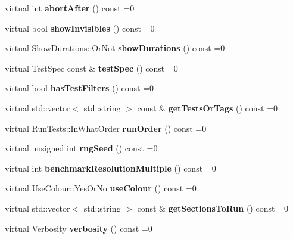 \begin{DoxyCompactItemize}
virtual int {\bfseries abort\+After} () const =0
\item 
\mbox{\label{structCatch_1_1IConfig_aa288bf92ccd0aafd85409d8aefdf738c}} 
virtual bool {\bfseries show\+Invisibles} () const =0
\item 
\mbox{\label{structCatch_1_1IConfig_abaa97d281484278291f0d3db6d404aeb}} 
virtual Show\+Durations\+::\+Or\+Not {\bfseries show\+Durations} () const =0
\item 
\mbox{\label{structCatch_1_1IConfig_a03a2fd8221d896d12bf3684ab2a03588}} 
virtual Test\+Spec const  \& {\bfseries test\+Spec} () const =0
\item 
\mbox{\label{structCatch_1_1IConfig_a49a475bbeb3180c06799d6d958914649}} 
virtual bool {\bfseries has\+Test\+Filters} () const =0
\item 
\mbox{\label{structCatch_1_1IConfig_a1b8a299344a493eb98c12faae48421d7}} 
virtual std\+::vector$<$ std\+::string $>$ const  \& {\bfseries get\+Tests\+Or\+Tags} () const =0
\item 
\mbox{\label{structCatch_1_1IConfig_a0fc59c9aba1d4018538d5526daa5eb78}} 
virtual Run\+Tests\+::\+In\+What\+Order {\bfseries run\+Order} () const =0
\item 
\mbox{\label{structCatch_1_1IConfig_ae049eb45979d841073fa65d1094c7f14}} 
virtual unsigned int {\bfseries rng\+Seed} () const =0
\item 
\mbox{\label{structCatch_1_1IConfig_a775f740b8af9df931e87db51dfdc6033}} 
virtual int {\bfseries benchmark\+Resolution\+Multiple} () const =0
\item 
\mbox{\label{structCatch_1_1IConfig_a87ec19a6b486eb5b5015cf7738fee026}} 
virtual Use\+Colour\+::\+Yes\+Or\+No {\bfseries use\+Colour} () const =0
\item 
\mbox{\label{structCatch_1_1IConfig_afc801995e115557f90e41f3d6e96908d}} 
virtual std\+::vector$<$ std\+::string $>$ const  \& {\bfseries get\+Sections\+To\+Run} () const =0
\item 
\mbox{\label{structCatch_1_1IConfig_a55aff5924bdbb3f558775821b1eb4b3d}} 
virtual Verbosity {\bfseries verbosity} () const =0
\end{DoxyCompactItemize}


